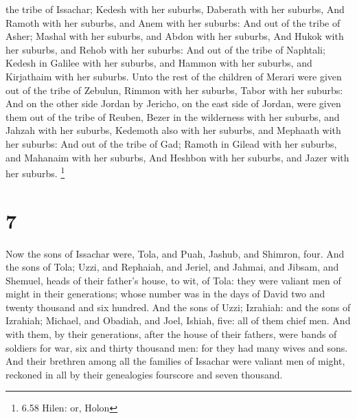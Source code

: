 the tribe of Issachar; Kedesh with her suburbs, Daberath with her
suburbs,  And Ramoth with her suburbs, and Anem with her
suburbs:  And out of the tribe of Asher; Mashal with her
suburbs, and Abdon with her suburbs,  And Hukok with her
suburbs, and Rehob with her suburbs:  And out of the tribe
of Naphtali; Kedesh in Galilee with her suburbs, and Hammon with her
suburbs, and Kirjathaim with her suburbs.  Unto the rest of
the children of Merari were given out of the tribe of Zebulun, Rimmon
with her suburbs, Tabor with her suburbs:  And on the other
side Jordan by Jericho, on the east side of Jordan, were given them out
of the tribe of Reuben, Bezer in the wilderness with her suburbs, and
Jahzah with her suburbs,  Kedemoth also with her suburbs,
and Mephaath with her suburbs:  And out of the tribe of
Gad; Ramoth in Gilead with her suburbs, and Mahanaim with her suburbs,
 And Heshbon with her suburbs, and Jazer with her suburbs.
\footnote{6.58 Hilen: or, Holon}

\hypertarget{section-6}{%
\section{7}\label{section-6}}

 Now the sons of Issachar were, Tola, and Puah, Jashub, and
Shimron, four.  And the sons of Tola; Uzzi, and Rephaiah,
and Jeriel, and Jahmai, and Jibsam, and Shemuel, heads of their father's
house, to wit, of Tola: they were valiant men of might in their
generations; whose number was in the days of David two and twenty
thousand and six hundred.  And the sons of Uzzi; Izrahiah:
and the sons of Izrahiah; Michael, and Obadiah, and Joel, Ishiah, five:
all of them chief men.  And with them, by their generations,
after the house of their fathers, were bands of soldiers for war, six
and thirty thousand men: for they had many wives and sons. 
And their brethren among all the families of Issachar were valiant men
of might, reckoned in all by their genealogies fourscore and seven
thousand.

